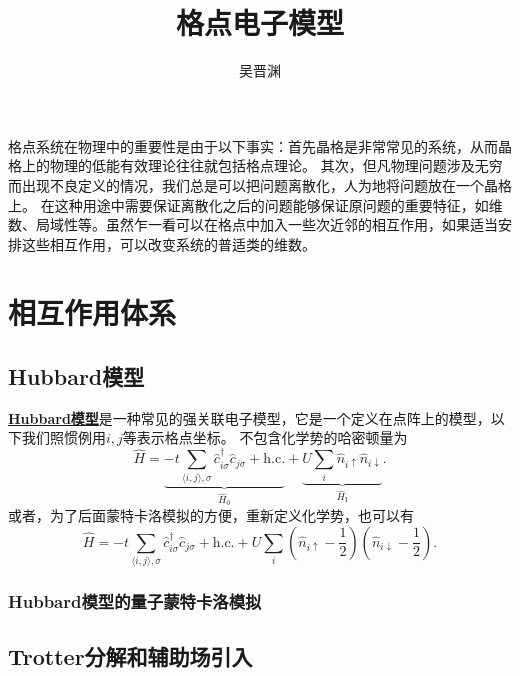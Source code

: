 \documentclass[hyperref, UTF8, a4paper]{ctexart}
\title{格点电子模型}
\author{吴晋渊}
\newcommand*{\pair}[1]{\langle #1 \rangle}
\newcommand*{\concept}[1]{\underline{\textbf{#1}}}
\begin{document}
\maketitle

格点系统在物理中的重要性是由于以下事实：首先晶格是非常常见的系统，从而晶格上的物理的低能有效理论往往就包括格点理论。
其次，但凡物理问题涉及无穷而出现不良定义的情况，我们总是可以把问题离散化，人为地将问题放在一个晶格上。
在这种用途中需要保证离散化之后的问题能够保证原问题的重要特征，如维数、局域性等。虽然乍一看可以在格点中加入一些次近邻的相互作用，如果适当安排这些相互作用，可以改变系统的普适类的维数。

\section{相互作用体系}

\subsection{Hubbard模型}

\concept{Hubbard模型}是一种常见的强关联电子模型，它是一个定义在点阵上的模型，以下我们照惯例用$i, j$等表示格点坐标。
不包含化学势的哈密顿量为
\begin{equation}
    \hat{H} = \underbrace{-t \sum_{\pair{i, j}, \sigma} \hat{c}_{i\sigma}^\dagger \hat{c}_{j\sigma} + \text{h.c.}}_{\hat{H}_0} + \underbrace{U \sum_i \hat{n}_{i \uparrow} \hat{n}_{i \downarrow}}_{\hat{H}_\text{I}}.
\end{equation}
或者，为了后面蒙特卡洛模拟的方便，重新定义化学势，也可以有
\begin{equation}
    \hat{H} = -t \sum_{\pair{i, j}, \sigma} \hat{c}_{i\sigma}^\dagger \hat{c}_{j\sigma} + \text{h.c.} 
    + U \sum_i \left(\hat{n}_{i\uparrow} - \frac{1}{2}\right) \left(\hat{n}_{i\downarrow} - \frac{1}{2}\right).
\end{equation}

\subsubsection{Hubbard模型的量子蒙特卡洛模拟}

\subsection{Trotter分解和辅助场引入}
\end{document}
